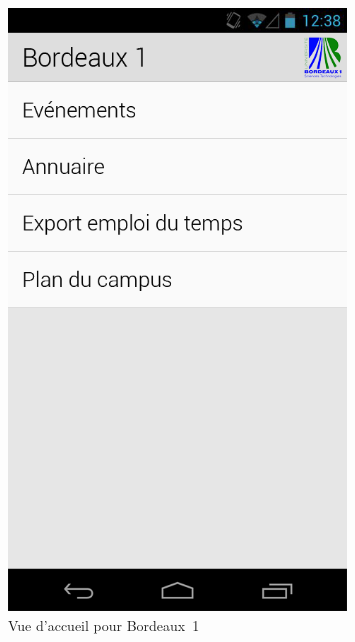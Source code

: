 \documentclass [pdftex,12pt] {report}
\begin{document}
\begin{figure}
\begin{minipage}[t]{8cm}
  \end{minipage}
  \hspace{+20pt}
  \begin{minipage}[t]{8cm}
    \centering
    \includegraphics[width=0.8\textwidth]{resources/ui_preview/02}
    \caption{Vue d'accueil pour Bordeaux~1}
    \label{fig:02}
  \end{minipage}
  \hspace{-60pt}
\end{figure}
\end{document}

